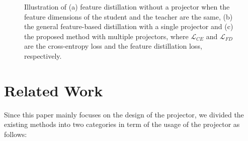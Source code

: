 \documentclass{article}
\begin{document}
\begin{figure}
	\hspace{5mm}
	\caption{Illustration of (a) feature distillation without a projector when the feature dimensions of the student and the teacher are the same, (b) the general feature-based distillation with a single projector \cite{cid,srrl} and (c) the proposed method with multiple projectors, where $\mathcal{L}_{CE}$ and $\mathcal{L}_{FD}$ are the cross-entropy loss and the feature distillation loss, respectively.}
	\label{pipeline}
\end{figure}

\section{Related Work}
Since this paper mainly focuses on the design of the projector, we divided the existing methods into two categories in term of the usage of the projector as follows:
\end{document}
